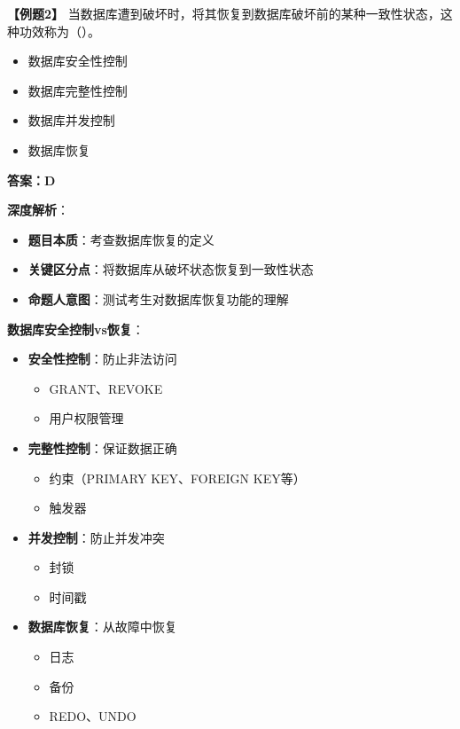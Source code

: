 \documentclass[12pt, a4paper]{article}
\newenvironment{bluebox}[1]{%
  \begin{trivlist}
  \item[\hskip\labelsep \textbf{#1}]
  \setlength{\parskip}{0.5ex}
  \setlength{\itemsep}{0.5ex}
}{%
  \end{trivlist}
  }
\begin{document}
\begin{bluebox}{例题2：数据库恢复}
	\textbf{【例题2】} 当数据库遭到破坏时，将其恢复到数据库破坏前的某种一致性状态，这种功效称为（\quad）。

	\begin{itemize}
		\item[A)] 数据库安全性控制
		\item[B)] 数据库完整性控制
		\item[C)] 数据库并发控制
		\item[D)] 数据库恢复
	\end{itemize}

	\textbf{答案：D}

	\textbf{深度解析}：

	\begin{itemize}[leftmargin=*, nosep]
		\item \textbf{题目本质}：考查数据库恢复的定义
		\item \textbf{关键区分点}：将数据库从破坏状态恢复到一致性状态
		\item \textbf{命题人意图}：测试考生对数据库恢复功能的理解
	\end{itemize}

	\textbf{数据库安全控制vs恢复}：

	\begin{itemize}[leftmargin=*, nosep]
		\item \textbf{安全性控制}：防止非法访问
		      \begin{itemize}[nosep]
			      \item GRANT、REVOKE
			      \item 用户权限管理
		      \end{itemize}

		\item \textbf{完整性控制}：保证数据正确
		      \begin{itemize}[nosep]
			      \item 约束（PRIMARY KEY、FOREIGN KEY等）
			      \item 触发器
		      \end{itemize}

		\item \textbf{并发控制}：防止并发冲突
		      \begin{itemize}[nosep]
			      \item 封锁
			      \item 时间戳
		      \end{itemize}

		\item \textbf{数据库恢复}：从故障中恢复
		      \begin{itemize}[nosep]
			      \item 日志
			      \item 备份
			      \item REDO、UNDO
		      \end{itemize}
	\end{itemize}


\end{bluebox}
\end{document}
